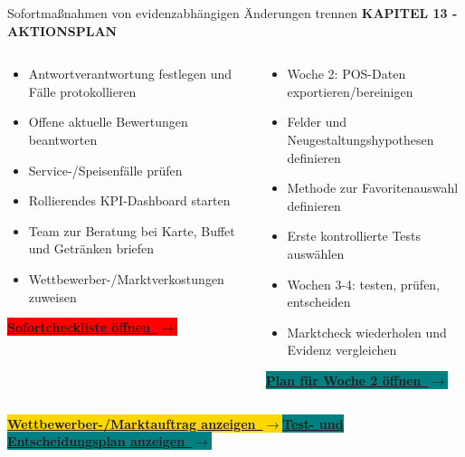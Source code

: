\documentclass[aspectratio=169,10pt]{beamer}
\newcommand{\sectiontag}[1]{{\color{Gold}\fontsize{6.8}{8}\selectfont\bfseries\MakeUppercase{#1}}\par\vspace{0.06cm}}
\newcommand{\pillbutton}[3]{\begingroup\setlength{\fboxsep}{0.10cm}\hyperlink{#1}{\colorbox{#3}{\color{white}\fontsize{6.8}{8}\selectfont\bfseries #2\ $\rightarrow$}}\endgroup}
\newcommand{\goldbutton}[2]{\pillbutton{#1}{#2}{Gold}}
\newcommand{\tealbutton}[2]{\pillbutton{#1}{#2}{Teal}}
\newcommand{\redbutton}[2]{\pillbutton{#1}{#2}{Red}}
\begin{document}
\begin{frame}{Sofortmaßnahmen von evidenzabhängigen Änderungen trennen}
  \hypertarget{m-ch13-content}{}\hypertarget{m-actions}{}\sectiontag{Kapitel 13 - Aktionsplan}
  \begin{columns}[T,onlytextwidth]\colorbox{PaleRed}{\parbox[c][4.45cm][t]{0.94\linewidth}{\par\vspace{0.10cm}\begin{itemize}\setlength\itemsep{0.07cm}\fontsize{7.8}{9.3}\selectfont\item Antwortverantwortung festlegen und Fälle protokollieren\item Offene aktuelle Bewertungen beantworten\item Service-/Speisenfälle prüfen\item Rollierendes KPI-Dashboard starten\item Team zur Beratung bei Karte, Buffet und Getränken briefen\item Wettbewerber-/Marktverkostungen zuweisen\end{itemize}\vfill\redbutton{a-actions}{Sofortcheckliste öffnen}}}\colorbox{PaleTeal}{\parbox[c][4.45cm][t]{0.94\linewidth}{\par\vspace{0.10cm}\begin{itemize}\setlength\itemsep{0.07cm}\fontsize{7.8}{9.3}\selectfont\item Woche 2: POS-Daten exportieren/bereinigen\item Felder und Neugestaltungshypothesen definieren\item Methode zur Favoritenauswahl definieren\item Erste kontrollierte Tests auswählen\item Wochen 3-4: testen, prüfen, entscheiden\item Marktcheck wiederholen und Evidenz vergleichen\end{itemize}\vfill\tealbutton{a-week2}{Plan für Woche 2 öffnen}}}\end{columns}
  \vfill\goldbutton{a-market-scan}{Wettbewerber-/Marktauftrag anzeigen}\quad\tealbutton{a-tests}{Test- und Entscheidungsplan anzeigen}
\end{frame}
\end{document}
